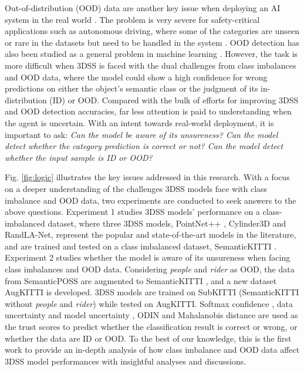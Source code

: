 \documentclass[journal]{IEEEtran}
\begin{document}
Out-of-distribution (OOD) data are another key issue when deploying an AI system in the real world \cite{marcus2018deep}\cite{hendrycks2016baseline}. The problem is very severe for safety-critical applications such as autonomous driving, where some of the categories are unseen or rare in the datasets but need to be handled in the system \cite{koopman2017autonomous}. OOD detection has also been studied as a general problem in machine learning \cite{salehi2021unified}. However, the task is more difficult when 3DSS is faced with the dual challenges from class imbalances and OOD data, where the model could show a high confidence for wrong predictions \cite{nguyen2015deep} on either the object's semantic class or the judgment of its in-distribution (ID) or OOD. Compared with the bulk of efforts for improving 3DSS and OOD detection accuracies, far less attention is paid to understanding when the agent is uncertain. With an intent towards real-world deployment, it is important to ask:
\textit{Can the model be aware of its unsureness? Can the model detect whether the category prediction is correct or not? Can the model detect whether the input sample is ID or OOD?}

Fig. \ref{fig:logic} illustrates the key issues addressed in this research. With a focus on a deeper understanding of the challenges 3DSS models face with class imbalance and OOD data, two experiments are conducted to seek answers to the above questions. Experiment 1 studies 3DSS models' performance on a class-imbalanced dataset, where three 3DSS models, PointNet++ \cite{qi2017pointnet++}, Cylinder3D \cite{zhou2020cylinder3d} and RandLA-Net\cite{hu2019randla}, represent the popular and state-of-the-art models in the literature, and are trained and tested on a class imbalanced dataset, SemanticKITTI \cite{behley2019semantickitti}. Experiment 2 studies whether the model is aware of its unsureness when facing class imbalances and OOD data. Considering \textit{people} and \textit{rider} as OOD, the data from SemanticPOSS \cite{pan2020semanticposs} are augmented to SemanticKITTI \cite{behley2019semantickitti}, and a new dataset AugKITTI is developed. 3DSS models are trained on SubKITTI (SemanticKITTI without \textit{people} and \textit{rider}) while tested on AugKITTI. Softmax confidence \cite{hendrycks2016baseline}, data uncertainty and model uncertainty \cite{kendall2017uncertainties} \cite{malinin2019uncertainty}, ODIN \cite{liang2017enhancing} and Mahalanobis distance \cite{lee2018simple} are used as the trust scores to predict whether the classification result is correct or wrong, or whether the data are ID or OOD. To the best of our knowledge, this is the first work to provide an in-depth analysis of how class imbalance and OOD data affect 3DSS model performances with insightful analyses and discussions.
\end{document}
